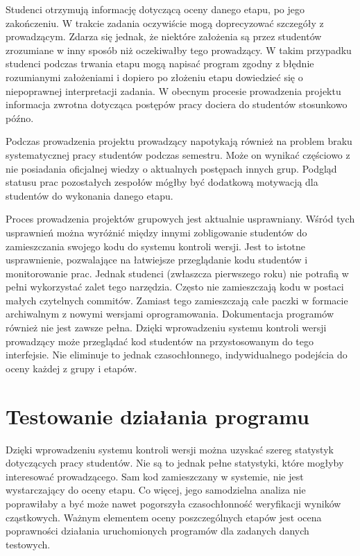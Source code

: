 Studenci otrzymują informację dotyczącą oceny danego etapu, po jego zakończeniu.
W trakcie zadania oczywiście mogą doprecyzować szczegóły z prowadzącym.
Zdarza się jednak, że niektóre założenia są przez studentów zrozumiane w inny sposób niż oczekiwałby tego prowadzący.
W takim przypadku studenci podczas trwania etapu mogą napisać program zgodny z błędnie rozumianymi założeniami i dopiero po złożeniu etapu dowiedzieć się o niepoprawnej interpretacji zadania.
W obecnym procesie prowadzenia projektu informacja zwrotna dotycząca postępów pracy dociera do studentów stosunkowo późno.

Podczas prowadzenia projektu prowadzący napotykają również na problem braku systematycznej pracy studentów podczas semestru.
Może on wynikać częściowo z nie posiadania oficjalnej wiedzy o aktualnych postępach innych grup.
Podgląd statusu prac pozostałych zespołów mógłby być dodatkową motywacją dla studentów do wykonania danego etapu.

Proces prowadzenia projektów grupowych jest aktualnie usprawniany. 
Wśród tych usprawnień można wyróżnić między innymi zobligowanie studentów do zamieszczania
swojego kodu do systemu kontroli wersji. 
Jest to istotne usprawnienie, pozwalające na łatwiejsze przeglądanie kodu studentów i monitorowanie prac. 
Jednak studenci (zwłaszcza pierwszego roku) nie potrafią w pełni wykorzystać zalet tego narzędzia. 
Często nie zamieszczają kodu w postaci małych czytelnych commitów.
Zamiast tego zamieszczają całe paczki w formacie archiwalnym z nowymi wersjami oprogramowania.
Dokumentacja programów również nie jest zawsze pełna.
Dzięki wprowadzeniu systemu kontroli wersji prowadzący może przeglądać kod studentów na przystosowanym do tego interfejsie. 
Nie eliminuje to jednak czasochłonnego, indywidualnego podejścia do oceny każdej z grupy i etapów.




\section{Testowanie działania programu}
\label{programs-testing}

Dzięki wprowadzeniu systemu kontroli wersji można uzyskać szereg statystyk dotyczących pracy studentów.
Nie są to jednak pełne statystyki, które mogłyby interesować prowadzącego.
Sam kod zamieszczany w systemie, nie jest wystarczający do oceny etapu.
Co więcej, jego samodzielna analiza nie poprawiłaby a być może nawet pogorszyła czasochłonność weryfikacji wyników cząstkowych.
Ważnym elementem oceny poszczególnych etapów jest ocena poprawności działania uruchomionych programów dla zadanych danych testowych.

